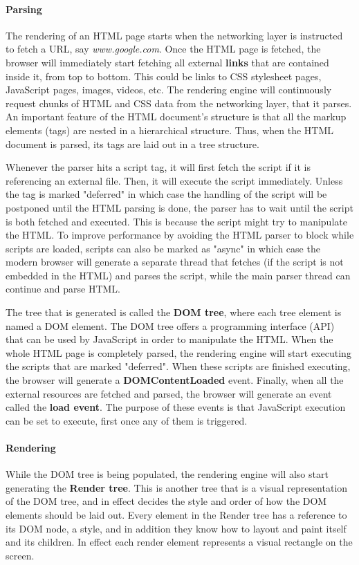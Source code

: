 \paragraph{Parsing} 
The rendering of an HTML page starts when the networking layer is instructed to fetch a URL, say \textit{www.google.com}. Once the HTML page is fetched, the browser will immediately start fetching all external \textbf{links} that are contained inside it, from top to bottom. This could be links to CSS stylesheet pages, JavaScript pages, images, videos, etc. The rendering engine will continuously request chunks of HTML and CSS data from the networking layer, that it parses. An important feature of the HTML document's structure is that all the markup elements (tags) are nested in a hierarchical structure. Thus, when the HTML document is parsed, its tags are laid out in a tree structure.

Whenever the parser hits a script tag, it will first fetch the script if it is referencing an external file. Then, it will execute the script immediately. Unless the tag is marked "deferred" in which case the handling of the script will be postponed until the HTML parsing is done, the parser has to wait until the script is both fetched and executed. This is because the script might try to manipulate the HTML. To improve performance by avoiding the HTML parser to block while scripts are loaded, scripts can also be marked as "async" in which case the modern browser will generate a separate thread that fetches (if the script is not embedded in the HTML) and parses the script, while the main parser thread can continue and parse HTML. 
 
 The tree that is generated is called the \textbf{DOM tree}, where each tree element is named a DOM element. The DOM tree offers a programming interface (API) that can be used by JavaScript in order to manipulate the HTML. When the whole HTML page is completely parsed, the rendering engine will start executing the scripts that are marked "deferred". When these scripts are finished executing, the browser will generate a \textbf{DOMContentLoaded} event. Finally, when all the external resources are fetched and parsed, the browser will generate an event called the \textbf{load event}. The purpose of these events is that JavaScript execution can be set to execute, first once any of them is triggered.

\paragraph{Rendering}
While the DOM tree is being populated, the rendering engine will also start generating the \textbf{Render tree}. This is another tree that is a visual representation of the DOM tree, and in effect decides the style and order of how the DOM elements should be laid out. Every element in the Render tree has a reference to its DOM node, a style, and in addition they know how to layout and paint itself and its children. In effect each render element represents a visual rectangle on the screen. 

